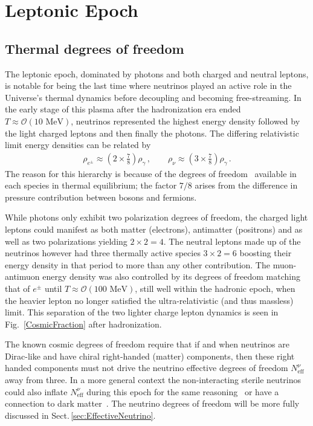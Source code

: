 \documentclass[universe,article,submit,moreauthors,pdftex,a4paper]{Definitions/mdpi}
\newcommand{\MeV}{\text{ MeV}}
\newcommand*{\rf}[1]{Fig.~{\ref{#1}}}
\newcommand*{\rsec}[1]{Sect.\,{\ref{#1}}}
\begin{document}
\section{Leptonic Epoch} \label{sec:Leptonic}
\subsection{Thermal degrees of freedom}\label{sec:Freedom}
\noindent The leptonic epoch, dominated by photons and both charged and neutral leptons, is notable for being the last time where neutrinos played an active role in the Universe's thermal dynamics before decoupling and becoming free-streaming. In the early stage of this plasma after the hadronization era ended $T\approx\mathcal{O}(10\MeV)$, neutrinos represented the highest energy density followed by the light charged leptons and then finally the photons. The differing relativistic limit energy densities can be related by
\begin{align}
\rho_{e^{\pm}}\approx\left(2\times\frac{7}{8}\right)\rho_{\gamma}\,,\qquad\rho_{\nu}\approx\left(3\times\frac{7}{8}\right)\rho_{\gamma}\,.
\end{align}
The reason for this hierarchy is because of the degrees of freedom~\cite{Letessier:2002ony,Rafelski:2013yka} available in each species in thermal equilibrium; the factor $7/8$ arises from the difference in pressure contribution between bosons and fermions. 

While photons only exhibit two polarization degrees of freedom, the charged light leptons could manifest as both matter (electrons), antimatter (positrons) and as well as two polarizations yielding $2\times2=4$. The neutral leptons made up of the neutrinos however had three thermally active species $3\times2=6$ boosting their energy density in that period to more than any other contribution. The muon-antimuon energy density was also controlled by its degrees of freedom matching that of $e^{\pm}$ until $T\approx\mathcal{O}(100\MeV)$, still well within the hadronic epoch, when the heavier lepton no longer satisfied the ultra-relativistic (and thus massless) limit. This separation of the two lighter charge lepton dynamics is seen in \rf{CosmicFraction} after hadronization.

The known cosmic degrees of freedom require that if and when neutrinos are Dirac-like and have chiral right-handed (matter) components, then  these right handed components must not  drive the neutrino effective degrees of freedom $N^{\nu}_{\mathrm{eff}}$ away from three. In a more general context the non-interacting sterile neutrinos could also inflate $N_{\mathrm{eff}}^{\nu}$ during this epoch for the same reasoning~\cite{Kopp:2011qd,Hamann:2011ge,Kopp:2013vaa,Lello:2014yha,Birrell:2014qna} or have a connection to dark matter~\cite{Weinberg:2013kea,Giusarma:2014zza}. The neutrino degrees of freedom will be more fully discussed in \rsec{sec:EffectiveNeutrino}.
\end{document}
